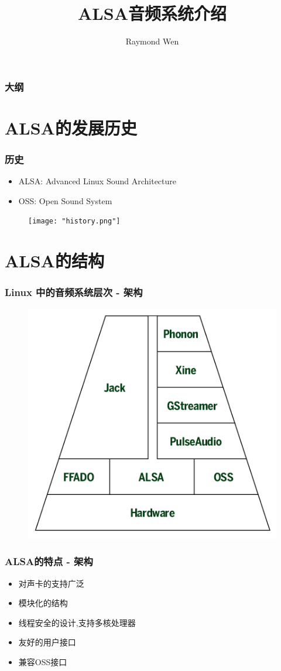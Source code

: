 \documentclass[CJK]{beamer}
\title[ALSA音频系统介绍]{ALSA音频系统介绍}
\author{Raymond Wen}
\begin{document}
\begin{frame}
    \titlepage
\end{frame}

\begin{frame}
    \frametitle{大纲}
    \tableofcontents[pausesections]
\end{frame}

\section{ALSA的发展历史}
\begin{frame}[t]
    \frametitle{历史}
    \begin{block}{}
        \begin{itemize}
            \item ALSA: Advanced Linux Sound Architecture 
            \item OSS: Open Sound System
        \end{itemize}
    \end{block}
    \begin{figure}[b]
        \texttt{[image: "history.png"]}
    \end{figure}
\end{frame}

\section{ALSA的结构}
\begin{frame}[t]
    \frametitle{Linux 中的音频系统层次 - 架构}
    \begin{figure}
        \includegraphics[height=200bp]{"linux_audio_layers.png"}
    \end{figure}
\end{frame}

\begin{frame}
    \frametitle{ALSA的特点 - 架构}
    \begin{itemize}
        \item 对声卡的支持广泛
        \item 模块化的结构
        \item 线程安全的设计,支持多核处理器
        \item 友好的用户接口
        \item 兼容OSS接口
    \end{itemize}
\end{frame}
\end{document}
